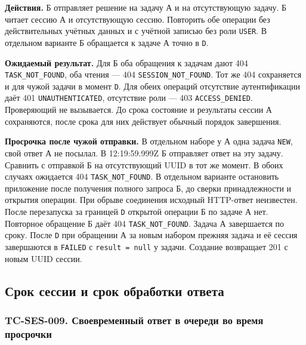 \documentclass[12pt,a4paper]{article}
\begin{document}
\textbf{Действия.} Б отправляет решение на задачу А и на отсутствующую задачу. Б читает сессию А и отсутствующую сессию. Повторить обе операции без действительных учётных данных и с учётной записью без роли \texttt{USER}. В отдельном варианте Б обращается к задаче А точно в \texttt{D}.

\textbf{Ожидаемый результат.} Для Б оба обращения к задачам дают 404 \texttt{TASK\_\allowbreak{}NOT\_\allowbreak{}FOUND}, оба чтения --- 404 \texttt{SESSION\_\allowbreak{}NOT\_\allowbreak{}FOUND}. Тот же 404 сохраняется и для чужой задачи в момент \texttt{D}. Для обеих операций отсутствие аутентификации даёт 401 \texttt{UNAUTHENTICATED}, отсутствие роли --- 403 \texttt{ACCESS\_\allowbreak{}DENIED}. Проверяющий не вызывается. До срока состояние и результаты сессии А сохраняются, после срока для них действует обычный порядок завершения.

\textbf{Просрочка после чужой отправки.} В отдельном наборе у А одна задача \texttt{NEW}, свой ответ А не посылал. В 12:19:59.999Z Б отправляет ответ на эту задачу. Сравнить с отправкой Б на отсутствующий UUID в тот же момент. В обоих случаях ожидается 404 \texttt{TASK\_\allowbreak{}NOT\_\allowbreak{}FOUND}. В отдельном варианте остановить приложение после получения полного запроса Б, до сверки принадлежности и открытия операции. При обрыве соединения исходный HTTP-ответ неизвестен. После перезапуска за границей \texttt{D} открытой операции Б по задаче А нет. Повторное обращение Б даёт 404 \texttt{TASK\_\allowbreak{}NOT\_\allowbreak{}FOUND}. Задача А завершается по сроку. После \texttt{D} при обращении А за новым набором прежняя задача и её сессия завершаются в \texttt{FAILED} с \texttt{result\ =\ null} у задачи. Создание возвращает 201 с новым UUID сессии.

\subsection{Срок сессии и срок обработки ответа}\label{ux441ux440ux43eux43a-ux441ux435ux441ux441ux438ux438-ux438-ux441ux440ux43eux43a-ux43eux431ux440ux430ux431ux43eux442ux43aux438-ux43eux442ux432ux435ux442ux430}

\hypertarget{срок-сессии-и-срок-обработки-ответа}{}

\subsubsection{TC-SES-009. Своевременный ответ в очереди во время просрочки}\label{tc-ses-009-ux441ux432ux43eux435ux432ux440ux435ux43cux435ux43dux43dux44bux439-ux43eux442ux432ux435ux442-ux432-ux43eux447ux435ux440ux435ux434ux438-ux432ux43e-ux432ux440ux435ux43cux44f-ux43fux440ux43eux441ux440ux43eux447ux43aux438}
\end{document}

